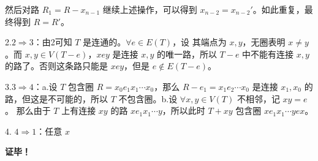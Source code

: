 然后对路 $R_1=R-x_{n-1}$ 继续上述操作，可以得到 $x_{n-2}=x_{n-2}'$。如此重复，最终得到 $R=R'$。

2.$2\Rightarrow 3$：由2可知 $T$ 是连通的。$\forall e\in E(T)$，设 其端点为 $x,y$，无圈表明 $x\neq y$。而 $x,y\in V(T-e)$，$xey$ 是连接 $x,y$ 的唯一路，所以 $T-e$ 中不能有连接 $x,y$ 的路了。否则这条路只能是 $xey$，但是 $e\not\in E(T-e)$。

3.$3\Rightarrow 4$：a.设 $T$ 包含圈 $R=x_0e_1x_1\cdots x_0$，那么 $R-e_1=x_1e_2\cdots x_0$ 是连接 $x_1,x_0$ 的路，但这是不可能的，所以 $T$ 不包含圈。b.设 $\forall x,y\in V(T)$ 不相邻，记 $xy=e$。 那么由于 $T$ 上有连接 $xy$ 的路 $xe_1x_1\cdots y$，所以此时 $T+xy$ 包含圈 $xe_1x_1\cdots yex$。 

4. $4\Rightarrow 1$：任意 $x$



\textbf{证毕！}






















